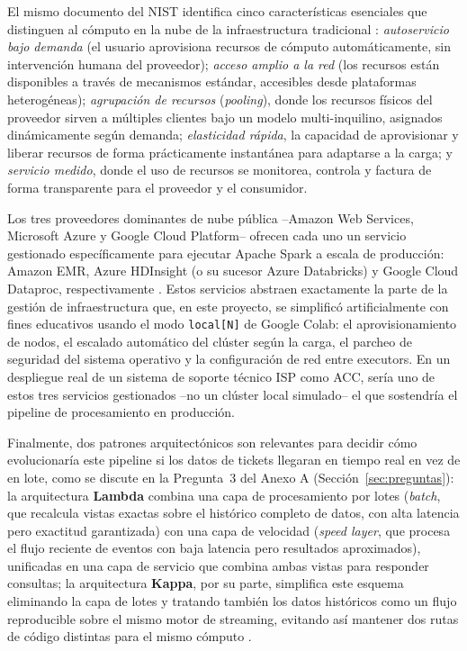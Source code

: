 \documentclass[11pt,a4paper]{article}
\begin{document}
El mismo documento del NIST identifica cinco caracter\'isticas esenciales que
distinguen al c\'omputo en la nube de la infraestructura tradicional
\cite{mell2011}: \emph{autoservicio bajo demanda} (el usuario aprovisiona
recursos de c\'omputo autom\'aticamente, sin intervenci\'on humana del
proveedor); \emph{acceso amplio a la red} (los recursos est\'an disponibles a
trav\'es de mecanismos est\'andar, accesibles desde plataformas
heterog\'eneas); \emph{agrupaci\'on de recursos} (\emph{pooling}), donde los
recursos f\'isicos del proveedor sirven a m\'ultiples clientes bajo un modelo
multi-inquilino, asignados din\'amicamente seg\'un demanda; \emph{elasticidad
r\'apida}, la capacidad de aprovisionar y liberar recursos de forma
pr\'acticamente instant\'anea para adaptarse a la carga; y \emph{servicio
medido}, donde el uso de recursos se monitorea, controla y factura de forma
transparente para el proveedor y el consumidor.

Los tres proveedores dominantes de nube p\'ublica --Amazon Web Services,
Microsoft Azure y Google Cloud Platform-- ofrecen cada uno un servicio
gestionado espec\'ificamente para ejecutar Apache Spark a escala de
producci\'on: Amazon EMR, Azure HDInsight (o su sucesor Azure Databricks) y
Google Cloud Dataproc, respectivamente \cite{chambers2018,zaharia2016}. Estos
servicios abstraen exactamente la parte de la gesti\'on de infraestructura
que, en este proyecto, se simplific\'o artificialmente con fines educativos
usando el modo \texttt{local[N]} de Google Colab: el aprovisionamiento de
nodos, el escalado autom\'atico del cl\'uster seg\'un la carga, el parcheo de
seguridad del sistema operativo y la configuraci\'on de red entre executors.
En un despliegue real de un sistema de soporte t\'ecnico ISP como ACC,
ser\'ia uno de estos tres servicios gestionados --no un cl\'uster local
simulado-- el que sostendr\'ia el pipeline de procesamiento en producci\'on.

Finalmente, dos patrones arquitect\'onicos son relevantes para decidir c\'omo
evolucionar\'ia este pipeline si los datos de tickets llegaran en tiempo real
en vez de en lote, como se discute en la Pregunta~3 del Anexo A
(Secci\'on~\ref{sec:preguntas}): la arquitectura \textbf{Lambda} combina una
capa de procesamiento por lotes (\emph{batch}, que recalcula vistas exactas
sobre el hist\'orico completo de datos, con alta latencia pero exactitud
garantizada) con una capa de velocidad (\emph{speed layer}, que procesa el
flujo reciente de eventos con baja latencia pero resultados aproximados),
unificadas en una capa de servicio que combina ambas vistas para responder
consultas; la arquitectura \textbf{Kappa}, por su parte, simplifica este
esquema eliminando la capa de lotes y tratando tambi\'en los datos
hist\'oricos como un flujo reproducible sobre el mismo motor de streaming,
evitando as\'i mantener dos rutas de c\'odigo distintas para el mismo
c\'omputo \cite{zaharia2016,mell2011}.
\end{document}
